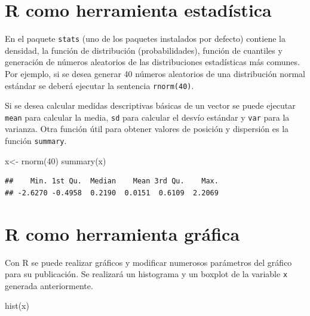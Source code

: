 \documentclass[
]{book}
\newenvironment{Shaded}{\begin{snugshade}}{\end{snugshade}}
\newcommand{\DecValTok}[1]{\textcolor[rgb]{0.00,0.00,0.81}{#1}}
\newcommand{\FunctionTok}[1]{\textcolor[rgb]{0.00,0.00,0.00}{#1}}
\newcommand{\NormalTok}[1]{#1}
\newcommand{\OtherTok}[1]{\textcolor[rgb]{0.56,0.35,0.01}{#1}}
\begin{document}
\hypertarget{r-como-herramienta-estaduxedstica}{%
\section{R como herramienta estadística}\label{r-como-herramienta-estaduxedstica}}

En el paquete \texttt{stats} (uno de los paquetes instalados por defecto) contiene la densidad, la función de distribución (probabilidades), función de cuantiles y generación de números aleatorios de las distribuciones estadísticas más comunes. Por ejemplo, si se desea generar 40 números aleatorios de una distribución normal estándar se deberá ejecutar la sentencia \texttt{rnorm(40)}.

Si se desea calcular medidas descriptivas básicas de un vector se puede ejecutar \texttt{mean} para calcular la media, \texttt{sd} para calcular el desvío estándar y \texttt{var} para la varianza. Otra función útil para obtener valores de posición y dispersión es la función \texttt{summary}.

\begin{Shaded}
\begin{Highlighting}[]
\NormalTok{x}\OtherTok{\textless{}{-}} \FunctionTok{rnorm}\NormalTok{(}\DecValTok{40}\NormalTok{)}
\FunctionTok{summary}\NormalTok{(x)}
\end{Highlighting}
\end{Shaded}

\begin{verbatim}
##    Min. 1st Qu.  Median    Mean 3rd Qu.    Max. 
## -2.6270 -0.4958  0.2190  0.0151  0.6109  2.2069
\end{verbatim}

\hypertarget{r-como-herramienta-gruxe1fica}{%
\section{R como herramienta gráfica}\label{r-como-herramienta-gruxe1fica}}

Con R se puede realizar gráficos y modificar numerosos parámetros del gráfico para su publicación. Se realizará un histograma y un boxplot de la variable \texttt{x} generada anteriormente.

\begin{Shaded}
\begin{Highlighting}[]
\FunctionTok{hist}\NormalTok{(x)}
\end{Highlighting}
\end{Shaded}
\end{document}
